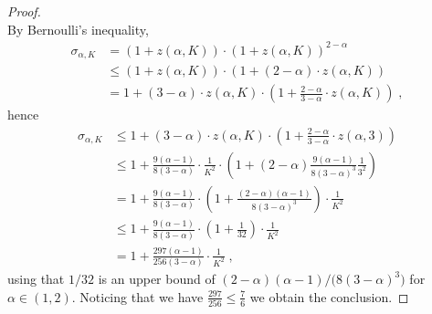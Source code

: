 \documentclass[10pt,a4paper]{amsart}
\newcommand{\brb}[1]{\bigl(#1\bigr)}
\newcommand{\lrb}[1]{\left(#1\right)}
\begin{document}
\begin{proof}
\[\]
By Bernoulli's inequality,
\begin{align*}
    \sigma_{\alpha, K}
&=
    \lrb{1 + z(\alpha, K)}
    \cdot (1 + z(\alpha, K))^{2-\alpha}
\\
&\le
    (1 + z(\alpha, K))\cdot (1 + (2- \alpha)\cdot z(\alpha, K))
\\
&=
    1 + (3 - \alpha)\cdot  z(\alpha, K) \cdot 
        \lrb{1 +  \frac{2 - \alpha}{3 - \alpha} \cdot z(\alpha, K) }
\;,
\end{align*}
hence
\begin{align*}
    \sigma_{\alpha, K}
&\le
    1 + (3 - \alpha) \cdot z(\alpha, K) \cdot 
        \lrb{1 +  \frac{2 - \alpha}{3 - \alpha} \cdot z(\alpha, 3)}
\\
&\le
    1 +  \frac{9(\alpha - 1)}{8(3- \alpha)}
           \cdot \frac{1}{K^2}\cdot 
        \lrb{1 +  (2 - \alpha)\frac{9(\alpha - 1)}{8(3- \alpha)^3} \frac{1}{3^2}}
\\
&=
    1 +  \frac{9(\alpha - 1)}{8(3- \alpha)} 
        \cdot \lrb{1 +  \frac{(2-\alpha)(\alpha - 1)}{8(3- \alpha)^3}}
        \cdot \frac{1}{K^2}
\\
&\le
    1 +  \frac{9(\alpha - 1)}{8(3- \alpha)} 
        \cdot \lrb{1 +  \frac{1}{32}}
        \cdot \frac{1}{K^2}
\\
&=
    1 +  \frac{297(\alpha - 1)}{256(3- \alpha)} 
        \cdot \frac{1}{K^2}\;,
\end{align*}
using that $1/32$ is an upper bound of $(2-\alpha)(\alpha - 1)/\brb{8(3- \alpha)^3}$ for $\alpha \in (1, 2)$.
Noticing that we have $\frac{297}{256} \le \frac{7}{6}$ we obtain the conclusion.
\end{proof}
\end{document}
